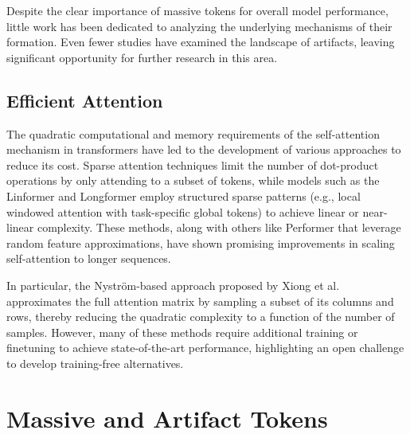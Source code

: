 \documentclass[10pt,twocolumn,letterpaper]{article}
\begin{document}
Despite the clear importance of massive tokens for overall model performance, little work has been dedicated to analyzing the underlying mechanisms of their formation. Even fewer studies have examined the landscape of artifacts, leaving significant opportunity for further research in this area. 


\subsection{Efficient Attention}
The quadratic computational and memory requirements of the self-attention mechanism \cite{vaswani2017attention} in transformers have led to the development of various approaches to reduce its cost. Sparse attention techniques \cite{chen2023sparse} \cite{child2019sparseattn} \cite{ren2021combiner} limit the number of dot-product operations by only attending to a subset of tokens, while models such as the Linformer \cite{wang2020linformer} and Longformer \cite{beltagy2020longformer} employ structured sparse patterns (e.g., local windowed attention with task-specific global tokens) to achieve linear or near-linear complexity. These methods, along with others like Performer \cite{choromanski2020performer} that leverage random feature approximations, have shown promising improvements in scaling self-attention to longer sequences. 

In particular, the Nystr\"om-based approach proposed by Xiong et al. \cite{xiong2021nystromformer} approximates the full attention matrix by sampling a subset of its columns and rows, thereby reducing the quadratic complexity to a function of the number of samples. However, many of these methods require additional training or finetuning to achieve state-of-the-art performance, highlighting an open challenge to develop training-free alternatives.
 \section{Massive and Artifact Tokens}
\label{sec:artifact_tokens}
\end{document}
